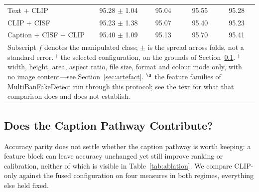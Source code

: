 \documentclass[journal]{IEEEtran}
\begin{document}
\begin{table}[!tb]
\begin{tabular}{lcccc}
Text + CLIP           & 95.28 $\pm$ 1.04 & 95.04 & 95.55 & 95.28 \\
CLIP + CISF           & 95.23 $\pm$ 1.38 & 95.07 & 95.40 & 95.23 \\
Caption + CISF + CLIP & 95.40 $\pm$ 1.09 & 95.13 & 95.70 & 95.41 \\
\bottomrule
\multicolumn{5}{p{0.95\columnwidth}}{\footnotesize Subscript $f$ denotes the
manipulated class; $\pm$ is the spread across folds, not a standard error.
$^{\dagger}$ the selected configuration, on the grounds of
Section~\ref{sec:fusion}. $^{\ddagger}$ width, height, area, aspect ratio, file
size, format and colour mode only, with no image content---see
Section~\ref{sec:artefact}. $^{\S}$ the feature families of
MultiBanFakeDetect \cite{multibanfake} run through this protocol; see the text
for what that comparison does and does not establish.}
\end{tabular}
\end{table}

\subsection{Does the Caption Pathway Contribute?}
\label{sec:fusion}

Accuracy parity does not settle whether the caption pathway is worth keeping: a
feature block can leave accuracy unchanged yet still improve ranking or
calibration, neither of which is visible in Table~\ref{tab:ablation}. We
compare CLIP-only against the fused configuration on four measures in both
regimes, everything else held fixed.
\end{document}
